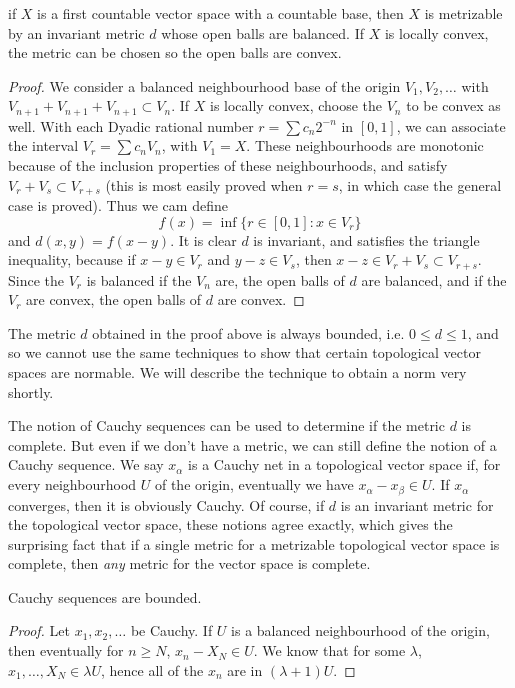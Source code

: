 \begin{theorem}
    if $X$ is a first countable vector space with a countable base, then $X$ is metrizable by an invariant metric $d$ whose open balls are balanced. If $X$ is locally convex, the metric can be chosen so the open balls are convex.
\end{theorem}
\begin{proof}
    We consider a balanced neighbourhood base of the origin $V_1, V_2, \dots$ with $V_{n+1} + V_{n+1} + V_{n+1} \subset V_n$. If $X$ is locally convex, choose the $V_n$ to be convex as well. With each Dyadic rational number $r = \sum c_n 2^{-n}$ in $[0,1]$, we can associate the interval $V_r = \sum c_n V_n$, with $V_1 = X$. These neighbourhoods are monotonic because of the inclusion properties of these neighbourhoods, and satisfy $V_r + V_s \subset V_{r+s}$ (this is most easily proved when $r = s$, in which case the general case is proved). Thus we cam define
    \[ f(x) = \inf \{ r \in [0,1] : x \in V_r \} \]
    and $d(x,y) = f(x-y)$. It is clear $d$ is invariant, and satisfies the triangle inequality, because if $x - y \in V_r$ and $y - z \in V_s$, then $x - z \in V_r + V_s \subset V_{r + s}$. Since the $V_r$ is balanced if the $V_n$ are, the open balls of $d$ are balanced, and if the $V_r$ are convex, the open balls of $d$ are convex.
\end{proof}

\begin{remark}
    The metric $d$ obtained in the proof above is always bounded, i.e. $0 \leq d \leq 1$, and so we cannot use the same techniques to show that certain topological vector spaces are normable. We will describe the technique to obtain a norm very shortly.
\end{remark}

The notion of Cauchy sequences can be used to determine if the metric $d$ is complete. But even if we don't have a metric, we can still define the notion of a Cauchy sequence. We say $x_\alpha$ is a Cauchy net in a topological vector space if, for every neighbourhood $U$ of the origin, eventually we have $x_\alpha - x_\beta \in U$. If $x_\alpha$ converges, then it is obviously Cauchy. Of course, if $d$ is an invariant metric for the topological vector space, these notions agree exactly, which gives the surprising fact that if a single metric for a metrizable topological vector space is complete, then {\it any} metric for the vector space is complete.

\begin{theorem}
    Cauchy sequences are bounded.
\end{theorem}
\begin{proof}
    Let $x_1, x_2, \dots$ be Cauchy. If $U$ is a balanced neighbourhood of the origin, then eventually for $n \geq N$, $x_n - X_N \in U$. We know that for some $\lambda$, $x_1, \dots, X_N \in \lambda U$, hence all of the $x_n$ are in $(\lambda + 1)U$.
\end{proof}


